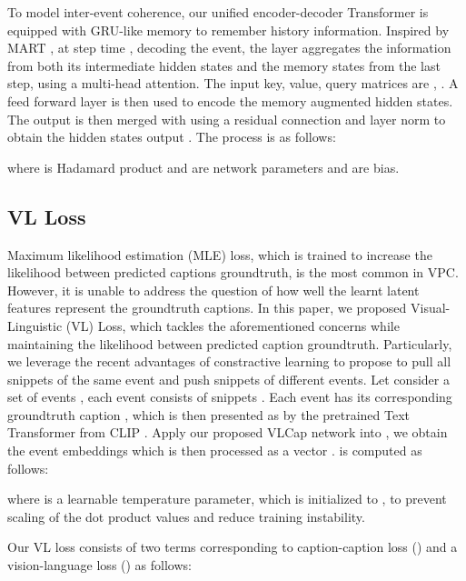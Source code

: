 \documentclass{article}
\begin{document}
\vspace{-1mm}
To model inter-event coherence, our unified encoder-decoder Transformer is equipped with GRU-like memory to remember history information. Inspired by MART \cite{lei2020mart}, at step time , decoding the  event, the  layer aggregates the information from both its intermediate hidden states  and the memory states  from the last step, using a multi-head attention. The input key, value, query matrices are , . A feed forward layer is then used to encode the memory augmented hidden states. The output is then merged with  using a residual connection and layer norm to obtain the hidden states output . The process is as follows:
\vspace{-1mm}

where  is Hadamard product and  are network parameters and  are bias.
\vspace{-3.5mm}
\subsection{VL Loss}
\vspace{-2mm}
Maximum likelihood estimation (MLE) loss, which is trained to increase the likelihood between predicted captions groundtruth, is the most common in VPC. However, it is unable to address the question of how well the learnt latent features represent the groundtruth captions. In this paper, we proposed Visual-Linguistic (VL) Loss, which tackles the aforementioned concerns while maintaining the likelihood between predicted caption groundtruth. Particularly, we leverage the recent advantages of constractive learning to propose  to pull all snippets of the same event and push snippets of different events. Let consider a set of  events , each event  consists of  snippets . Each event  has its corresponding groundtruth caption , which is then presented as  by the pretrained Text Transformer from CLIP \cite{radford2021learning}. Apply our proposed VLCap network into , we obtain the event embeddings  which is then processed as a vector .  is computed as follows:
\vspace{-2mm}


where  is a learnable temperature parameter, which is initialized to , to prevent scaling of the dot product values and reduce training instability.

Our VL loss  consists of two terms corresponding to caption-caption loss () and a vision-language loss () as follows:
\end{document}
